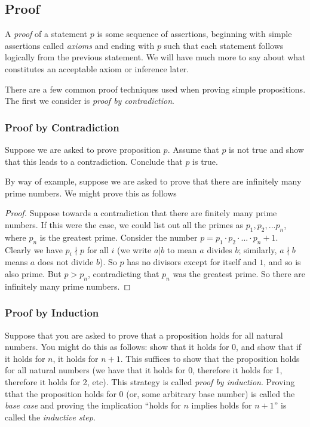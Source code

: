 \subsection{Proof}
A \emph{proof} of a statement $p$ is some sequence of assertions, beginning with simple assertions called \emph{axioms} and ending with $p$ such that each statement follows logically from the previous statement. We will have much more to say about what constitutes an acceptable axiom or inference later. 

There are a few common proof techniques used when proving simple propositions. The first we consider is \emph{proof by contradiction}. 

\subsubsection*{Proof by Contradiction} Suppose we are asked to prove proposition $p$. Assume that $p$ is not true and show that this leads to a contradiction. Conclude that $p$ is true. 

By way of example, suppose we are asked to prove that there are infinitely many prime numbers. We might prove this as follows

\begin{proof}
Suppose towards a contradiction that there are finitely many prime numbers. If this were the case, we could list out all the primes as $p_1,p_2,...p_n$, where $p_n$ is the greatest prime. Consider the number $p = p_1 \cdot p_2 \cdot ... \cdot p_n + 1$. Clearly we have $p_i \nmid p$ for all $i$ (we write $a | b$ to mean $a$ divides $b$; similarly, $a \nmid b$ means $a$ does not divide $b$). So $p$ has no divisors except for itself and $1$, and so is also prime. But $p > p_n$, contradicting that $p_n$ was the greatest prime. So there are infinitely many prime numbers. 
\end{proof}

\subsubsection*{Proof by Induction} Suppose that you are asked to prove that a proposition holds for all natural numbers. You might do this as follows: show that it holds for 0, and show that if it holds for $n$, it holds for $n + 1$. This suffices to show that the proposition holds for all natural numbers (we have that it holds for 0, therefore it holds for 1, therefore it holds for 2, etc). This strategy is called \emph{proof by induction}. Proving tthat the proposition holds for 0 (or, some arbitrary base number) is called the \emph{base case} and proving the implication ``holds for $n$ implies holds for $n + 1$'' is called the \emph{inductive step}. 

